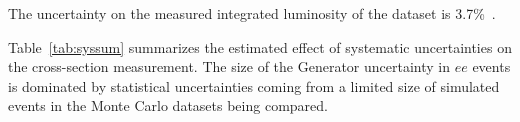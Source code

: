 
%
The uncertainty on the measured integrated luminosity of the dataset is 3.7\%~\cite{ATLAS:2011cia}.

Table~\ref{tab:syssum} summarizes the estimated effect of systematic uncertainties
on the cross-section measurement.
The size of the Generator uncertainty in $ee$ events is dominated by statistical uncertainties coming
from a limited size of simulated events in the Monte Carlo datasets being compared.



